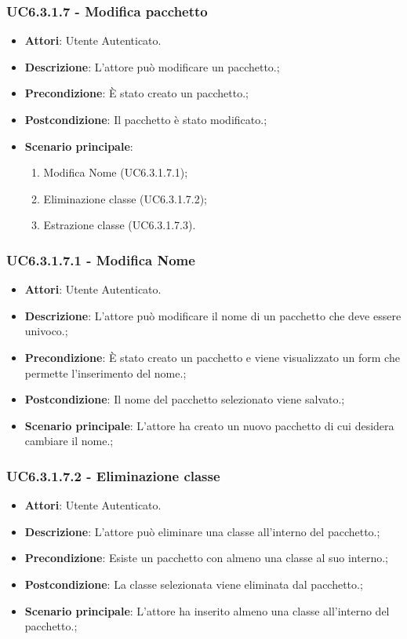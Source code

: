 \subsubsection{UC6.3.1.7 - Modifica pacchetto} 
\label{sssec:UC6.3.1.7} 
\begin{itemize} 
\item \textbf{Attori}: Utente Autenticato.
\item \textbf{Descrizione}: L'attore può modificare un pacchetto.;
\item \textbf{Precondizione}: È stato creato un pacchetto.;
\item \textbf{Postcondizione}: Il pacchetto è stato modificato.;
\item \textbf{Scenario principale}: \begin{enumerate}\item Modifica Nome (UC6.3.1.7.1);\item Eliminazione classe (UC6.3.1.7.2);\item Estrazione classe (UC6.3.1.7.3). 
 \end{enumerate}
\end{itemize} 
\subsubsection{UC6.3.1.7.1 - Modifica Nome} 
\label{sssec:UC6.3.1.7.1} 
\begin{itemize} 
\item \textbf{Attori}: Utente Autenticato.
\item \textbf{Descrizione}: L'attore può modificare il nome di un pacchetto che deve essere univoco.;
\item \textbf{Precondizione}: È stato creato un pacchetto e viene visualizzato un form che permette l'inserimento del nome.;
\item \textbf{Postcondizione}: Il nome del pacchetto selezionato viene salvato.;
\item \textbf{Scenario principale}: L'attore ha creato un nuovo pacchetto di cui desidera cambiare il nome.;\end{itemize} 
\subsubsection{UC6.3.1.7.2 - Eliminazione classe} 
\label{sssec:UC6.3.1.7.2} 
\begin{itemize} 
\item \textbf{Attori}: Utente Autenticato.
\item \textbf{Descrizione}: L'attore può eliminare una classe all'interno del pacchetto.;
\item \textbf{Precondizione}: Esiste un pacchetto con almeno una classe al suo interno.;
\item \textbf{Postcondizione}: La classe selezionata viene eliminata dal pacchetto.;
\item \textbf{Scenario principale}: L'attore ha inserito almeno una classe all'interno del pacchetto.;\end{itemize} 
